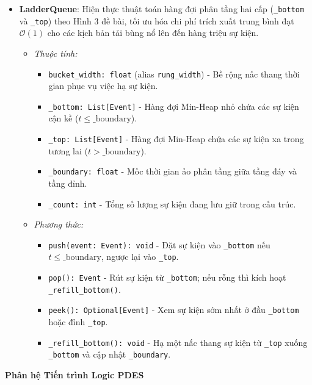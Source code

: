 \begin{itemize}[leftmargin=1.5em, itemsep=8pt]
\item \textbf{LadderQueue}: Hiện thực thuật toán hàng đợi phân tầng hai cấp (\texttt{\_bottom} và \texttt{\_top}) theo Hình 3 đề bài, tối ưu hóa chi phí trích xuất trung bình đạt $\mathcal{O}(1)$ cho các kịch bản tải bùng nổ lên đến hàng triệu sự kiện.

\begin{itemize}[leftmargin=1.2em, label={}, itemsep=3pt]
\item[\textendash] \textit{Thuộc tính:}
\begin{itemize}[leftmargin=1.5em, label=+, itemsep=2pt]
\item \texttt{bucket\_width: float} (alias \texttt{rung\_width}) - Bề rộng nấc thang thời gian phục vụ việc hạ sự kiện.
\item \texttt{\_bottom: List[Event]} - Hàng đợi Min-Heap nhỏ chứa các sự kiện cận kề ($t \le \text{\_boundary}$).
\item \texttt{\_top: List[Event]} - Hàng đợi Min-Heap chứa các sự kiện xa trong tương lai ($t > \text{\_boundary}$).
\item \texttt{\_boundary: float} - Mốc thời gian ảo phân tầng giữa tầng đáy và tầng đỉnh.
\item \texttt{\_count: int} - Tổng số lượng sự kiện đang lưu giữ trong cấu trúc.
\end{itemize}

\item[\textendash] \textit{Phương thức:}
\begin{itemize}[leftmargin=1.5em, label=+, itemsep=2pt]
\item \texttt{push(event: Event): void} - Đặt sự kiện vào \texttt{\_bottom} nếu $t \le \text{\_boundary}$, ngược lại vào \texttt{\_top}.
\item \texttt{pop(): Event} - Rút sự kiện từ \texttt{\_bottom}; nếu rỗng thì kích hoạt \texttt{\_refill\_bottom()}.
\item \texttt{peek(): Optional[Event]} - Xem sự kiện sớm nhất ở đầu \texttt{\_bottom} hoặc đỉnh \texttt{\_top}.
\item \texttt{\_refill\_bottom(): void} - Hạ một nấc thang sự kiện từ \texttt{\_top} xuống \texttt{\_bottom} và cập nhật \texttt{\_boundary}.
\end{itemize}
\end{itemize}
\end{itemize}

\textbf{\color{red}Phân hệ Tiến trình Logic PDES}

